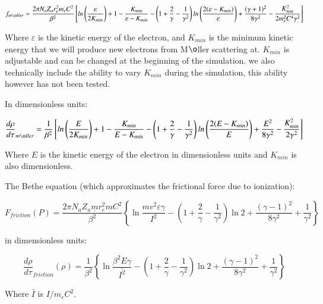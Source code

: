 \documentclass[]{article}
\begin{document}
\begin{equation}
f_{m\o ller}=\frac{2\pi N_a Z_a r_e^2 m_e C^2}{\beta^2}\left[ ln\left( \frac{\varepsilon}{2K_{min}} \right) +1 - \frac{K_{min}}{\varepsilon- K_{min}} - \left(1+\frac{2}{\gamma}-\frac{1}{\gamma^2} \right) ln \left(   \frac{2(\varepsilon-K_{min})}{\varepsilon}\right) + \frac{(\gamma+1)^2}{8\gamma^2} - \frac{K_{min}^2}{2m_e^2C^4\gamma^2}   \right] 
\end{equation}

Where $\varepsilon$ is the kinetic energy of the electron, and $K_{min}$ is the minimum kinetic energy that we will produce new electrons from M$\o$ller scattering at. $K_{min}$ is adjustable and can be changed at the beginning of the simulation. we also technically include the ability to vary $K_{min}$ during the simulation, this ability however has not been tested.

In dimensionless units:

\begin{equation}
\frac{d \rho}{d \tau}_{m\o ller}=\frac{1}{\beta^2}\left[ ln\left( \frac{E}{2K_{min}} \right) +1 - \frac{K_{min}}{E- K_{min}} - \left(1+\frac{2}{\gamma}-\frac{1}{\gamma^2} \right) ln \left(   \frac{2(E-K_{min})}{E}\right) + \frac{E^2}{8\gamma^2} - \frac{K_{min}^2}{2\gamma^2}   \right] 
\end{equation}

Where $E$ is the kinetic energy of the electron in dimensionless units and $K_{min}$ is also dimensionless.

The Bethe equation (which approximates the frictional force due to ionization):

\begin{equation} 
F_{friction}(P)  =\frac{ 2 \pi N_a Z_a\underline{m} r_e^2 m C^2}{\beta^2} \left\lbrace  \ln\frac{mv^2\varepsilon\gamma}{I^2}
-\left( 1 + \frac{2}{\gamma}  - \frac{1}{\gamma^2} \right)\ln 2 + \frac{(\gamma-1)^2}{8\gamma^2}  + \frac{1}{\gamma^2} \right\rbrace 
\end{equation}

in dimensionless units:

\begin{equation} 
\frac{d \rho}{d \tau}_{friction}(\rho)  =\frac{ 1 }{\beta^2} \left\lbrace  \ln\frac{\beta^2E\gamma}{\bar{I^2}}
-\left( 1 + \frac{2}{\gamma}  - \frac{1}{\gamma^2} \right)\ln 2 + \frac{(\gamma-1)^2}{8\gamma^2}  + \frac{1}{\gamma^2} \right\rbrace 
\end{equation}

Where $\bar{I}$ is $I/m_eC^2$.
\end{document}
